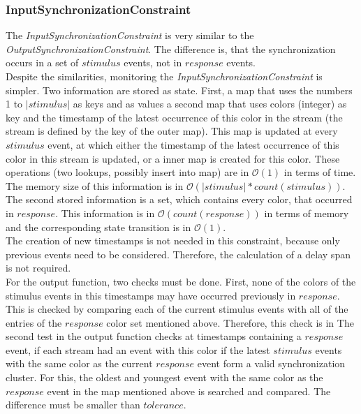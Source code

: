 \subsubsection{InputSynchronizationConstraint}
	The \emph{InputSynchronizationConstraint} is very similar to the \emph{OutputSynchronizationConstraint}. The difference is, that the synchronization occurs in a set of $stimulus$ events, not in $response$ events.\\
	Despite the similarities, monitoring the \emph{InputSynchronizationConstraint} is simpler. Two information are stored as state. First, a map that uses the numbers 1 to $|stimulus|$ as keys and as values a second map that uses colors (integer) as key and the timestamp of the latest occurrence of this color in the stream (the stream is defined by the key of the outer map). This map is updated at every $stimulus$ event, at which either the timestamp of the latest occurrence of this color in this stream is updated, or a inner map is created for this color. These operations (two lookups, possibly insert into map) are in $\mathcal{O}(1)$ in terms of time. The memory size of this information is in $\mathcal{O}(|stimulus|*count(stimulus))$.\\
	The second stored information is a set, which contains every color, that occurred in $response$. This information is in $\mathcal{O}(count(response))$ in terms of memory and the corresponding state transition is in $\mathcal{O}(1)$.\\
	The creation of new timestamps is not needed in this constraint, because only previous events need to be considered. Therefore, the calculation of a delay span is not required.\\
	For the output function, two checks must be done. First, none of the colors of the stimulus events in this timestamps may have occurred previously in $response$. This is checked by comparing each of the current stimulus events with all of the entries of the $response$ color set mentioned above. Therefore, this check is in %
	The second test in the output function checks at timestamps containing a $response$ event, if each stream had an event with this color if the latest $stimulus$ events with the same color as the current $response$ event form a valid synchronization cluster. For this, the oldest and youngest event with the same color as the $response$ event in the map mentioned above is searched and compared. The difference must be smaller than $tolerance$.%
	
